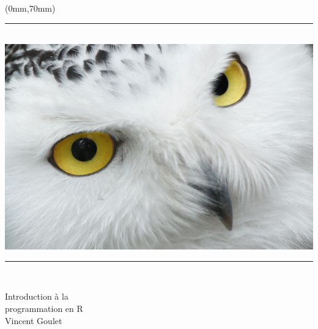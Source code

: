 \documentclass[letterpaper,11pt]{memoir}
\begin{document}
\begin{textblock*}{216mm}(0mm,70mm)
  \rule{216mm}{3pt} \\
  \includegraphics{harfang2.jpg} \\[-\baselineskip]
  \rule{216mm}{3pt} \\
\end{textblock*}

\begin{adjustwidth*}{-12mm}{-30mm}
  \sffamily
  \raggedright
  \vspace*{-17mm}
  \fontsize{42}{42}\selectfont
  Introduction
  \fontsize{42}{42}\selectfont
  à la \\
  \fontsize{42}{42}\selectfont
  programmation
  \fontsize{42}{42}\selectfont
  en
  \fontsize{42}{42}\selectfont
  R \\
  \vspace*{160mm}
  \fontsize{28}{36}\selectfont
  Vincent Goulet
\end{adjustwidth*}


\newpage
\end{document}
